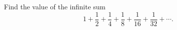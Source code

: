 Find the value of the infinite sum
\[
1+\dfrac{1}{2}+\dfrac{1}{4}+\dfrac{1}{8}+\dfrac{1}{16}+\dfrac{1}{32}+\cdots .
\]

